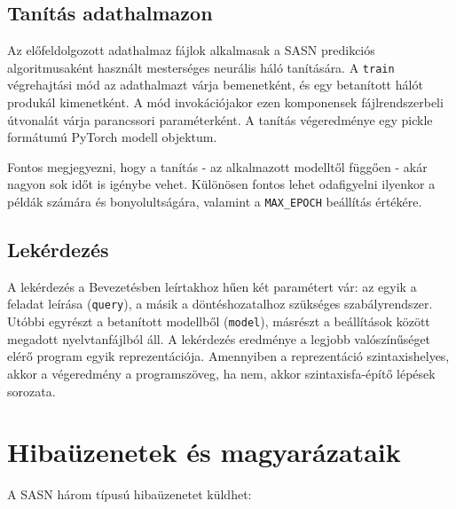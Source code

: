 \documentclass[twoside, 12pt]{report}
\begin{document}
\subsection{Tanítás adathalmazon}

Az előfeldolgozott adathalmaz fájlok alkalmasak a SASN predikciós algoritmusaként használt mesterséges neurális háló tanítására. A \verb|train| végrehajtási mód az adathalmazt várja bemenetként, és egy betanított hálót produkál kimenetként. A mód invokációjakor ezen komponensek fájlrendszerbeli útvonalát várja parancssori paraméterként. A tanítás végeredménye egy pickle formátumú PyTorch modell objektum.

Fontos megjegyezni, hogy a tanítás - az alkalmazott modelltől függően - akár nagyon sok időt is igénybe vehet. Különösen fontos lehet odafigyelni ilyenkor a példák számára és bonyolultságára, valamint a \verb|MAX_EPOCH| beállítás értékére.

\subsection{Lekérdezés}

A lekérdezés a Bevezetésben leírtakhoz hűen két paramétert vár: az egyik a feladat leírása (\verb|query|), a másik a döntéshozatalhoz szükséges szabályrendszer. Utóbbi egyrészt a betanított modellből (\verb|model|), másrészt a beállítások között megadott nyelvtanfájlból áll. A lekérdezés eredménye a legjobb valószínűséget elérő program egyik reprezentációja. Amennyiben a reprezentáció szintaxishelyes, akkor a végeredmény a programszöveg, ha nem, akkor szintaxisfa-építő lépések sorozata.

\section{Hibaüzenetek és magyarázataik}

A SASN három típusú hibaüzenetet küldhet:
\end{document}
